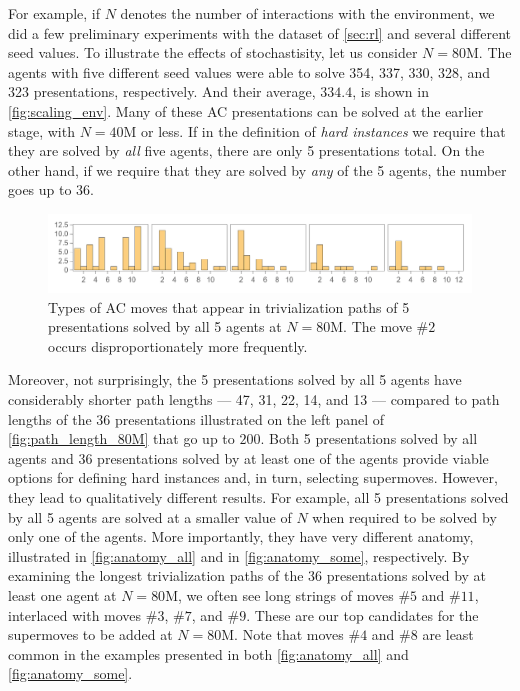 For example, if $N$ denotes the number of interactions with the environment, we did a few preliminary experiments with the dataset of \autoref{sec:rl} and several different seed values. To illustrate the effects of stochastisity, let us consider $N=80$M. The agents with five different seed values were able to solve 354, 337, 330, 328, and 323 presentations, respectively. And their average, $334.4$, is shown in \autoref{fig:scaling_env}. Many of these AC presentations can be solved at the earlier stage, with $N=40$M or less. If in the definition of \textit{hard instances} we require that they are solved by \textit{all} five agents, there are only 5 presentations total. On the other hand, if we require that they are solved by \textit{any} of the 5 agents, the number goes up to 36.

\begin{figure}[h]
    \centering
	\includegraphics[scale=0.6]{fig/anatomy_all.png}
	\caption{Types of AC moves that appear in trivialization paths of 5 presentations solved by all 5 agents at $N=80$M. The move $\# 2$ occurs disproportionately more frequently.}
	\label{fig:anatomy_all}
\end{figure}

Moreover, not surprisingly, the 5 presentations solved by all 5 agents have considerably shorter path lengths --- 47, 31, 22, 14, and 13 --- compared to path lengths of the 36 presentations illustrated on the left panel of \autoref{fig:path_length_80M} that go up to $200$. Both 5 presentations solved by all agents and 36 presentations solved by at least one of the agents provide viable options for defining hard instances and, in turn, selecting supermoves. However, they lead to qualitatively different results. For example, all 5 presentations solved by all 5 agents are solved at a smaller value of $N$ when required to be solved by only one of the agents. More importantly, they have very different anatomy, illustrated in \autoref{fig:anatomy_all} and in \autoref{fig:anatomy_some}, respectively.
%
By examining the longest trivialization paths of the 36 presentations solved by at least one agent at $N=80$M, we often see long strings of moves $\# 5$ and $\# 11$, interlaced with moves $\# 3$, $\# 7$, and $\# 9$. These are our top candidates for the supermoves to be added at $N=80$M.
%
Note that moves $\# 4$ and $\# 8$ are least common in the examples presented in both \autoref{fig:anatomy_all} and \autoref{fig:anatomy_some}.

